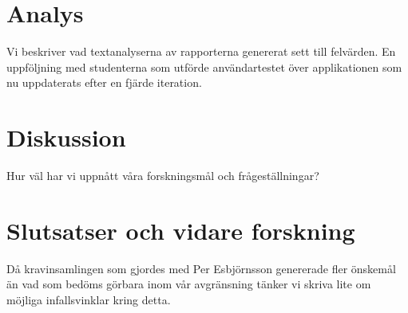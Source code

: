 \documentclass[swedish]{maucsthesis}
\begin{document}
\section{Analys}
Vi beskriver vad textanalyserna av rapporterna genererat sett till felvärden. En
uppföljning med studenterna som utförde användartestet över applikationen som nu
uppdaterats efter en fjärde iteration.
\section{Diskussion}
Hur väl har vi uppnått våra forskningsmål och frågeställningar?
\section{Slutsatser och vidare forskning}
Då kravinsamlingen som gjordes med Per Esbjörnsson genererade fler önskemål än
vad som bedöms görbara inom vår avgränsning tänker vi skriva lite om möjliga
infallsvinklar kring detta.

%
\newpage
{}


\end{document}
